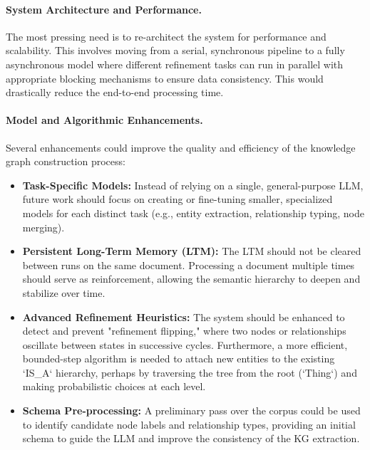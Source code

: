 \paragraph{System Architecture and Performance.}
The most pressing need is to re-architect the system for performance and scalability. This involves moving from a serial, synchronous pipeline to a fully asynchronous model where different refinement tasks can run in parallel with appropriate blocking mechanisms to ensure data consistency. This would drastically reduce the end-to-end processing time.

\paragraph{Model and Algorithmic Enhancements.}
Several enhancements could improve the quality and efficiency of the knowledge graph construction process:
\begin{itemize}
    \item \textbf{Task-Specific Models:} Instead of relying on a single, general-purpose LLM, future work should focus on creating or fine-tuning smaller, specialized models for each distinct task (e.g., entity extraction, relationship typing, node merging).
    \item \textbf{Persistent Long-Term Memory (LTM):} The LTM should not be cleared between runs on the same document. Processing a document multiple times should serve as reinforcement, allowing the semantic hierarchy to deepen and stabilize over time.
    \item \textbf{Advanced Refinement Heuristics:} The system should be enhanced to detect and prevent "refinement flipping," where two nodes or relationships oscillate between states in successive cycles. Furthermore, a more efficient, bounded-step algorithm is needed to attach new entities to the existing `IS\_A` hierarchy, perhaps by traversing the tree from the root (`Thing`) and making probabilistic choices at each level.
    \item \textbf{Schema Pre-processing:} A preliminary pass over the corpus could be used to identify candidate node labels and relationship types, providing an initial schema to guide the LLM and improve the consistency of the KG extraction.
\end{itemize}

